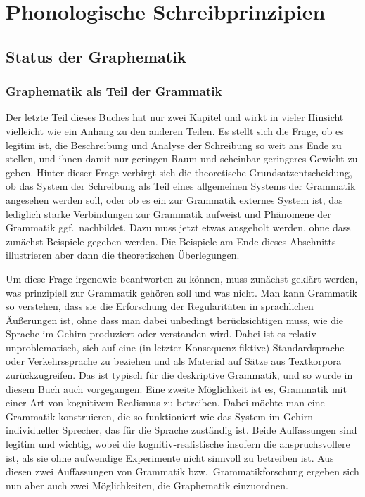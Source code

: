 \chapter{Phonologische Schreibprinzipien}

\label{sec:phonschrift}

\section{Status der Graphematik}

\subsection{Graphematik als Teil der Grammatik}

\label{sec:graphegrammatik}

Der letzte Teil dieses Buches hat nur zwei Kapitel und wirkt in vieler Hinsicht vielleicht wie ein Anhang zu den anderen Teilen.
Es stellt sich die Frage, ob es legitim ist, die Beschreibung und Analyse der Schreibung so weit ans Ende zu stellen, und ihnen damit nur geringen Raum und scheinbar geringeres Gewicht zu geben.
Hinter dieser Frage verbirgt sich die theoretische Grundsatzentscheidung, ob das System der Schreibung als Teil eines allgemeinen Systems der Grammatik angesehen werden soll, oder ob es ein zur Grammatik externes System ist, das lediglich starke Verbindungen zur Grammatik aufweist und Phänomene der Grammatik ggf.\ nachbildet.
Dazu muss jetzt etwas ausgeholt werden, ohne dass zunächst Beispiele gegeben werden.
Die Beispiele am Ende dieses Abschnitts illustrieren aber dann die theoretischen Überlegungen.

Um diese Frage irgendwie beantworten zu können, muss zunächst geklärt werden, was prinzipiell zur Grammatik gehören soll und was nicht.
Man kann Grammatik so verstehen, dass sie die Erforschung der Regularitäten in sprachlichen Äußerungen ist, ohne dass man dabei unbedingt berücksichtigen muss, wie die Sprache im Gehirn produziert oder verstanden wird.
Dabei ist es relativ unproblematisch, sich auf eine (in letzter Konsequenz fiktive) Standardsprache oder Verkehrssprache zu beziehen und als Material auf Sätze aus Textkorpora zurückzugreifen.
Das ist typisch für die deskriptive Grammatik, und so wurde in diesem Buch auch vorgegangen.
Eine zweite Möglichkeit ist es, Grammatik mit einer Art von kognitivem Realismus zu betreiben.
Dabei möchte man eine Grammatik konstruieren, die so funktioniert wie das System im Gehirn individueller Sprecher, das für die Sprache zuständig ist.
Beide Auffassungen sind legitim und wichtig, wobei die kognitiv-realistische insofern die anspruchsvollere ist, als sie ohne aufwendige Experimente nicht sinnvoll zu betreiben ist.
Aus diesen zwei Auffassungen von Grammatik bzw.\ Grammatikforschung ergeben sich nun aber auch zwei Möglichkeiten, die Graphematik einzuordnen.


